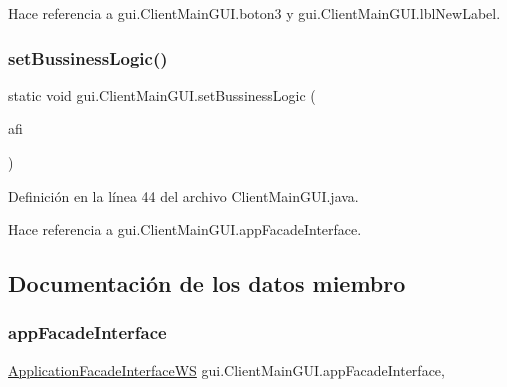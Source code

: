 Hace referencia a gui.\+Client\+Main\+G\+U\+I.\+boton3 y gui.\+Client\+Main\+G\+U\+I.\+lbl\+New\+Label.

\mbox{\label{classgui_1_1_client_main_g_u_i_adac6e82dffe9f7df0f185583970bf40f}} 
\subsubsection{\texorpdfstring{setBussinessLogic()}{setBussinessLogic()}}
{\footnotesize\ttfamily static void gui.\+Client\+Main\+G\+U\+I.\+set\+Bussiness\+Logic (\begin{DoxyParamCaption}\item[{\mbox{\hyperlink{interfacebusiness_logic_1_1_application_facade_interface_w_s}{Application\+Facade\+Interface\+WS}}}]{afi }\end{DoxyParamCaption})\hspace{0.3cm}{\ttfamily [static]}}



Definición en la línea 44 del archivo Client\+Main\+G\+U\+I.\+java.


\begin{DoxyCode}{0}

\end{DoxyCode}


Hace referencia a gui.\+Client\+Main\+G\+U\+I.\+app\+Facade\+Interface.



\subsection{Documentación de los datos miembro}
\mbox{\label{classgui_1_1_client_main_g_u_i_af59bb392168b3018e1f449ea153c09eb}} 
\subsubsection{\texorpdfstring{appFacadeInterface}{appFacadeInterface}}
{\footnotesize\ttfamily \mbox{\hyperlink{interfacebusiness_logic_1_1_application_facade_interface_w_s}{Application\+Facade\+Interface\+WS}} gui.\+Client\+Main\+G\+U\+I.\+app\+Facade\+Interface\hspace{0.3cm}{\ttfamily [static]}, {\ttfamily [private]}}



